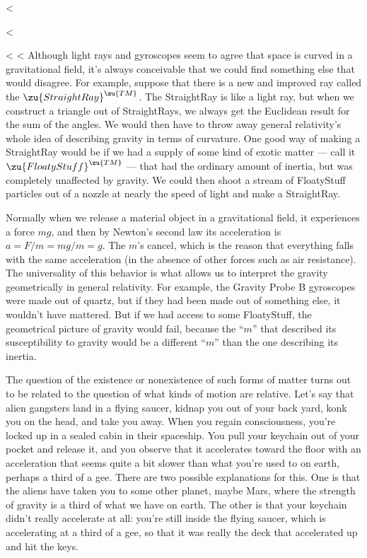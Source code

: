 <%

<%

<%
<%
Although light rays and gyroscopes seem to agree that space is curved in a gravitational field,
it's always conceivable that we could find something else that would disagree. For example,
suppose that there is a new and improved ray called the $\zu{StraightRay}^\zu{TM}$. The StraightRay
is like a light ray, but when we construct a triangle out of StraightRays, we always get the Euclidean
result for the sum of the angles. We would then have to throw away general relativity's whole idea of describing
gravity in terms of curvature. One good way of making a StraightRay would be if we had a supply of some kind
of exotic matter --- call it $\zu{FloatyStuff}^\zu{TM}$ --- that had the ordinary amount of inertia, but was completely unaffected by gravity.
We could then shoot a stream of FloatyStuff particles out of a nozzle at nearly the speed of light and make a StraightRay.

Normally when we release a material object in a gravitational field, it experiences a force $mg$, and
then by Newton's second law its acceleration is $a=F/m=mg/m=g$. The $m$'s cancel, which is the reason that
everything falls with the same acceleration (in the absence of other forces such as air resistance).
The universality of this behavior is what allows us to interpret the gravity geometrically in general
relativity. For example, the Gravity Probe B gyroscopes were made out of quartz, but if they had been made
out of something else, it wouldn't have mattered.
But if we had access to some FloatyStuff, the geometrical picture of gravity would fail, because the ``$m$'' that described
its susceptibility to gravity would be a different ``$m$'' than the one describing its inertia.

The question of the existence or nonexistence of such forms of matter turns out to be related to the
question of what kinds of motion are relative. Let's say that alien gangsters land in a flying saucer,
kidnap you out of your back yard, konk you on the head, and take you away. When you regain consciousness,
you're locked up in a sealed cabin in their spaceship. You pull your keychain out of your pocket and release it,
and you observe that it accelerates toward the floor with an acceleration that seems quite a bit slower than
what you're used to on earth, perhaps a third of a gee. There are two possible explanations for this. One is that the aliens
have taken you to some other planet, maybe Mars, where the strength of gravity is a third of what we have on earth.
The other is that your keychain didn't really accelerate at all: you're still inside the flying saucer, which is
accelerating at a third of a gee, so that it was really the deck that accelerated up and hit the keys.

